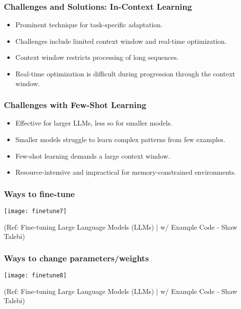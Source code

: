 \begin{frame}[fragile]\frametitle{Challenges and Solutions: In-Context Learning}
    \begin{itemize}
        \item Prominent technique for task-specific adaptation.
        \item Challenges include limited context window and real-time optimization.
        \item Context window restricts processing of long sequences.
        \item Real-time optimization is difficult during progression through the context window.
    \end{itemize}
\end{frame}

\begin{frame}[fragile]\frametitle{Challenges with Few-Shot Learning}
    \begin{itemize}
        \item Effective for larger LLMs, less so for smaller models.
        \item Smaller models struggle to learn complex patterns from few examples.
        \item Few-shot learning demands a large context window.
        \item Resource-intensive and impractical for memory-constrained environments.
    \end{itemize}
\end{frame}

\begin{frame}[fragile]\frametitle{Ways to fine-tune}


		\begin{center}
		\texttt{[image: finetune7]}
		\end{center}

{\tiny (Ref: Fine-tuning Large Language Models (LLMs) | w/ Example Code - Shaw Talebi)}

\end{frame}

\begin{frame}[fragile]\frametitle{Ways to change parameters/weights}


		\begin{center}
		\texttt{[image: finetune8]}
		\end{center}

{\tiny (Ref: Fine-tuning Large Language Models (LLMs) | w/ Example Code - Shaw Talebi)}

\end{frame}


